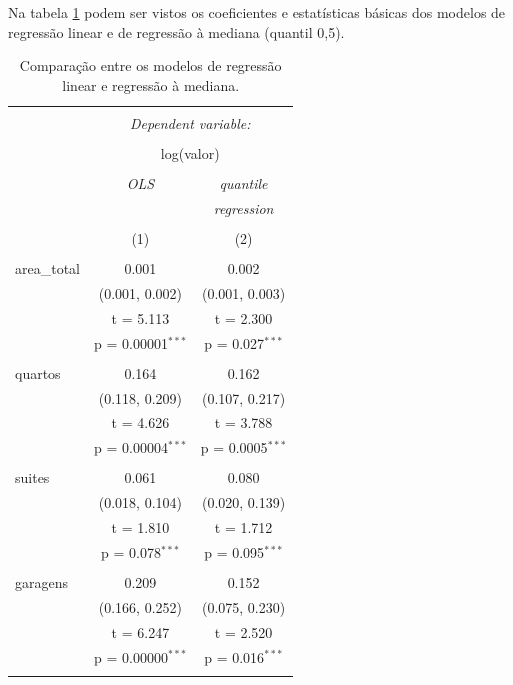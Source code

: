 \documentclass[a4paper, 12pt]{article}
\begin{document}
Na tabela \ref{tab:fits} podem ser vistos os coeficientes e estatísticas
básicas dos modelos de regressão linear e de regressão à mediana
(quantil 0,5).

\begin{table}[!htbp] \centering 
  \caption{Comparação entre os modelos de regressão linear e regressão à mediana.} 
  \label{tab:fits} 
\begin{tabular}{@{\extracolsep{5pt}}lcc} 
\\[-1.8ex]\hline 
\hline \\[-1.8ex] 
 & \multicolumn{2}{c}{\textit{Dependent variable:}} \\ 
\cline{2-3} 
\\[-1.8ex] & \multicolumn{2}{c}{log(valor)} \\ 
\\[-1.8ex] & \textit{OLS} & \textit{quantile} \\ 
 & \textit{} & \textit{regression} \\ 
\\[-1.8ex] & (1) & (2)\\ 
\hline \\[-1.8ex] 
 area\_total & 0.001 & 0.002 \\ 
  & (0.001, 0.002) & (0.001, 0.003) \\ 
  & t = 5.113 & t = 2.300 \\ 
  & p = 0.00001$^{***}$ & p = 0.027$^{***}$ \\ 
  & & \\ 
 quartos & 0.164 & 0.162 \\ 
  & (0.118, 0.209) & (0.107, 0.217) \\ 
  & t = 4.626 & t = 3.788 \\ 
  & p = 0.00004$^{***}$ & p = 0.0005$^{***}$ \\ 
  & & \\ 
 suites & 0.061 & 0.080 \\ 
  & (0.018, 0.104) & (0.020, 0.139) \\ 
  & t = 1.810 & t = 1.712 \\ 
  & p = 0.078$^{***}$ & p = 0.095$^{***}$ \\ 
  & & \\ 
 garagens & 0.209 & 0.152 \\ 
  & (0.166, 0.252) & (0.075, 0.230) \\ 
  & t = 6.247 & t = 2.520 \\ 
  & p = 0.00000$^{***}$ & p = 0.016$^{***}$ \\ 
  & & \\ 

\end{tabular}
\end{table}
\end{document}
